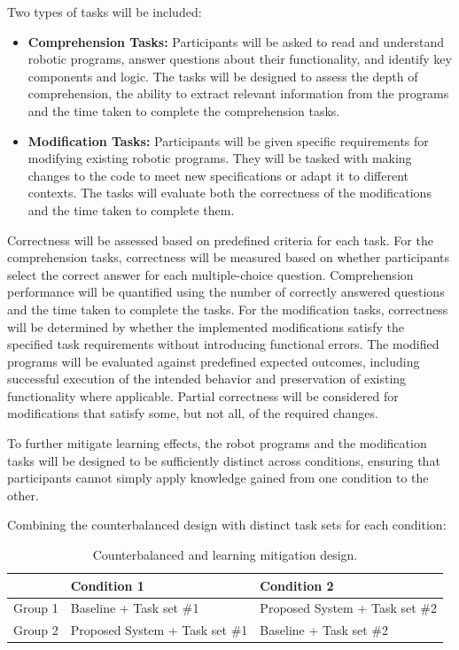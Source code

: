 Two types of tasks will be included:
\begin{itemize}
    \item \textbf{Comprehension Tasks:} Participants will be asked to read and understand robotic programs, answer questions about their functionality, and identify key components and logic. The tasks will be designed to assess the depth of comprehension, the ability to extract relevant information from the programs and the time taken to complete the comprehension tasks.
    \item \textbf{Modification Tasks:} Participants will be given specific requirements for modifying existing robotic programs. They will be tasked with making changes to the code to meet new specifications or adapt it to different contexts. The tasks will evaluate both the correctness of the modifications and the time taken to complete them.
\end{itemize}

Correctness will be assessed based on predefined criteria for each task. For the comprehension tasks, correctness will be measured based on whether participants select the correct answer for each multiple-choice question. Comprehension performance will be quantified using the number of correctly answered questions and the time taken to complete the tasks. For the modification tasks, correctness will be determined by whether the implemented modifications satisfy the specified task requirements without introducing functional errors. The modified programs will be evaluated against predefined expected outcomes, including successful execution of the intended behavior and preservation of existing functionality where applicable. Partial correctness will be considered for modifications that satisfy some, but not all, of the required changes.

To further mitigate learning effects, the robot programs and the modification tasks will be designed to be sufficiently distinct across conditions, ensuring that participants cannot simply apply knowledge gained from one condition to the other.

Combining the counterbalanced design with distinct task sets for each condition:
\begin{table}[H]
    \centering
    \begin{tabular}{p{} p{} p{}}
        \hline
                & \textbf{Condition 1}           & \textbf{Condition 2}           \\
        \hline
        Group 1 & Baseline + Task set \#1        & Proposed System + Task set \#2 \\
        Group 2 & Proposed System + Task set \#1 & Baseline + Task set \#2        \\
        \hline
    \end{tabular}
    \caption{Counterbalanced and learning mitigation design.}
\end{table}

